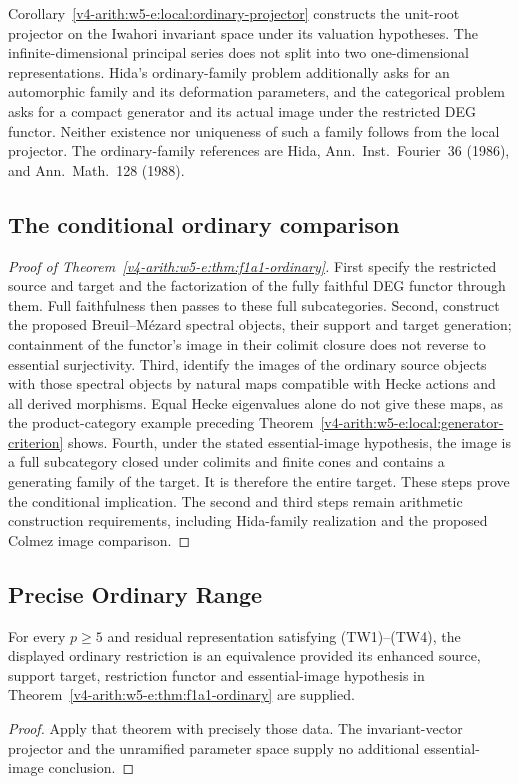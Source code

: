 \begin{remark}
\label{v4-arith:w5-e:lem:Hida-ord}
Corollary~\ref{v4-arith:w5-e:local:ordinary-projector} constructs the
unit-root projector on the Iwahori invariant space under its valuation
hypotheses. The infinite-dimensional principal series does not split
into two one-dimensional representations. Hida's ordinary-family
problem additionally asks for an automorphic family and its deformation
parameters, and the categorical problem asks for a compact generator
and its actual image under the restricted DEG functor. Neither existence
nor uniqueness of such a family follows from the local projector.
The ordinary-family references are Hida, Ann.\ Inst.\ Fourier~36
(1986), and Ann.\ Math.~128 (1988).
\end{remark}

\subsection{The conditional ordinary comparison}
\begin{proof}[Proof of Theorem~\ref{v4-arith:w5-e:thm:f1a1-ordinary}]
First specify the restricted source and target and the factorization of
the fully faithful DEG functor through them. Full faithfulness then
passes to these full subcategories. Second, construct the proposed
Breuil--M\'{e}zard spectral objects, their support and target generation;
containment of the functor's image in their colimit closure does not
reverse to essential surjectivity. Third, identify the images of the
ordinary source objects with those spectral objects by natural maps
compatible with Hecke actions and all derived morphisms. Equal Hecke
eigenvalues alone do not give these maps, as the product-category
example preceding Theorem~\ref{v4-arith:w5-e:local:generator-criterion}
shows. Fourth, under the stated essential-image hypothesis, the image
is a full subcategory closed under colimits and finite cones and contains
a generating family of the target. It is therefore the entire target.
These steps prove the conditional implication. The second and third
steps remain arithmetic construction requirements, including Hida-family
realization and the proposed Colmez image comparison.
\end{proof}

\subsection{Precise Ordinary Range}
\begin{corollary}
\label{v4-arith:w5-e:cor:f1a1-uncond-range}
For every $p\ge5$ and residual representation satisfying
(TW1)--(TW4), the displayed ordinary restriction is an equivalence
provided its enhanced source, support target, restriction functor and
essential-image hypothesis in
Theorem~\ref{v4-arith:w5-e:thm:f1a1-ordinary} are supplied.
\end{corollary}
\begin{proof}
Apply that theorem with precisely those data. The invariant-vector
projector and the unramified parameter space supply no additional
essential-image conclusion.
\end{proof}

